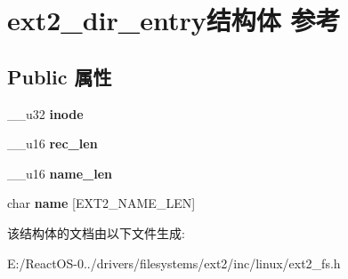 \hypertarget{structext2__dir__entry}{}\section{ext2\+\_\+dir\+\_\+entry结构体 参考}
\label{structext2__dir__entry}
\subsection*{Public 属性}
\begin{DoxyCompactItemize}
\item 
\mbox{\label{structext2__dir__entry_a0b65a0a408538aa582cf84ec545923a1}} 
\+\_\+\+\_\+u32 {\bfseries inode}
\item 
\mbox{\label{structext2__dir__entry_add644e791496d2d0a5935634e5b9aae2}} 
\+\_\+\+\_\+u16 {\bfseries rec\+\_\+len}
\item 
\mbox{\label{structext2__dir__entry_ac7acc91d972f4c12ab749ce37ee5e38f}} 
\+\_\+\+\_\+u16 {\bfseries name\+\_\+len}
\item 
\mbox{\label{structext2__dir__entry_a8e1b7a7bd8ab5854b676f235f3246d1b}} 
char {\bfseries name} \mbox{[}E\+X\+T2\+\_\+\+N\+A\+M\+E\+\_\+\+L\+EN\mbox{]}
\end{DoxyCompactItemize}


该结构体的文档由以下文件生成\+:\begin{DoxyCompactItemize}
\item 
E\+:/\+React\+O\+S-\/0../drivers/filesystems/ext2/inc/linux/ext2\+\_\+fs.\+h\end{DoxyCompactItemize}
